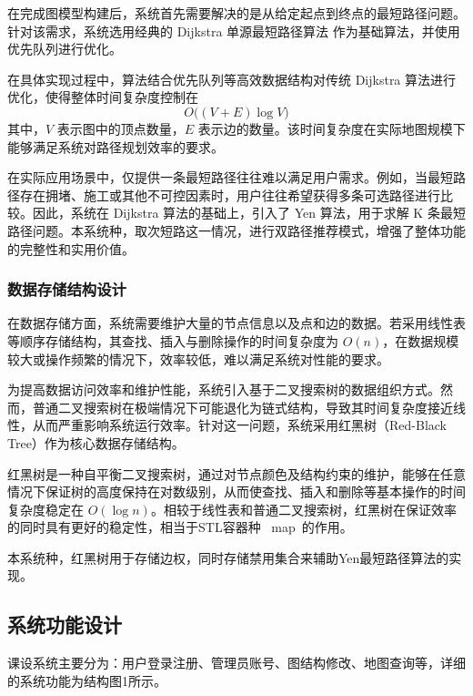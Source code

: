 \documentclass[UTF8,12pt,a4paper]{ctexart}
\begin{document}
\vspace{1em}

在完成图模型构建后，系统首先需要解决的是从给定起点到终点的最短路径问题。针对该需求，系统选用经典的 Dijkstra 单源最短路径算法 作为基础算法，并使用优先队列进行优化。

在具体实现过程中，算法结合优先队列等高效数据结构对传统 Dijkstra 算法进行优化，使得整体时间复杂度控制在
\[
O\big((V + E)\log V\big)
\]
其中，$V$ 表示图中的顶点数量，$E$ 表示边的数量。该时间复杂度在实际地图规模下能够满足系统对路径规划效率的要求。

\vspace{1em}

在实际应用场景中，仅提供一条最短路径往往难以满足用户需求。例如，当最短路径存在拥堵、施工或其他不可控因素时，用户往往希望获得多条可选路径进行比较。因此，系统在 Dijkstra 算法的基础上，引入了 Yen 算法，用于求解 K 条最短路径问题。本系统种，取次短路这一情况，进行双路径推荐模式，增强了整体功能的完整性和实用价值。

\subsubsection{数据存储结构设计}

在数据存储方面，系统需要维护大量的节点信息以及点和边的数据。若采用线性表等顺序存储结构，其查找、插入与删除操作的时间复杂度为 $O(n)$，在数据规模较大或操作频繁的情况下，效率较低，难以满足系统对性能的要求。

为提高数据访问效率和维护性能，系统引入基于二叉搜索树的数据组织方式。然而，普通二叉搜索树在极端情况下可能退化为链式结构，导致其时间复杂度接近线性，从而严重影响系统运行效率。针对这一问题，系统采用红黑树（Red-Black Tree）作为核心数据存储结构。

红黑树是一种自平衡二叉搜索树，通过对节点颜色及结构约束的维护，能够在任意情况下保证树的高度保持在对数级别，从而使查找、插入和删除等基本操作的时间复杂度稳定在 $O(\log n)$。相较于线性表和普通二叉搜索树，红黑树在保证效率的同时具有更好的稳定性，相当于STL容器种 \ map\  的作用。

本系统种，红黑树用于存储边权，同时存储禁用集合来辅助Yen最短路径算法的实现。

\subsection{系统功能设计}

课设系统主要分为：用户登录注册、管理员账号、图结构修改、地图查询等，详细的系统功能为结构图1所示。
\end{document}

